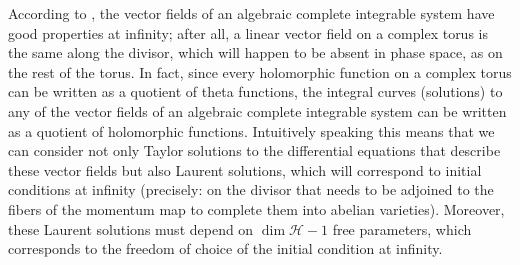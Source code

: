 \documentclass[10pt,a4paper]{amsart}
\numberwithin{equation}{section}
\begin{document}
According to \cite{al_Moer3}, the vector fields of an algebraic complete integrable system
have good properties at infinity; after all, a linear vector field
on a complex torus is the same along the divisor, which will happen
to be absent in phase space, as on the rest of the torus. In fact,
since every holomorphic function on a complex torus can be written
as a quotient of theta functions, the integral curves (solutions) to
any of the vector fields of an algebraic complete integrable system can be written as a
quotient of holomorphic functions. Intuitively speaking this means
that we can consider not only Taylor solutions to the differential
equations that describe these vector fields but also Laurent
solutions, which will correspond to initial conditions at infinity (precisely: on the divisor that needs to be adjoined to the fibers of
the momentum map to complete them into abelian varieties). Moreover,
these Laurent solutions must depend on $\dim \mathcal{H}-1$
free parameters, which corresponds to the freedom of choice of the
initial condition at infinity.
\end{document}

